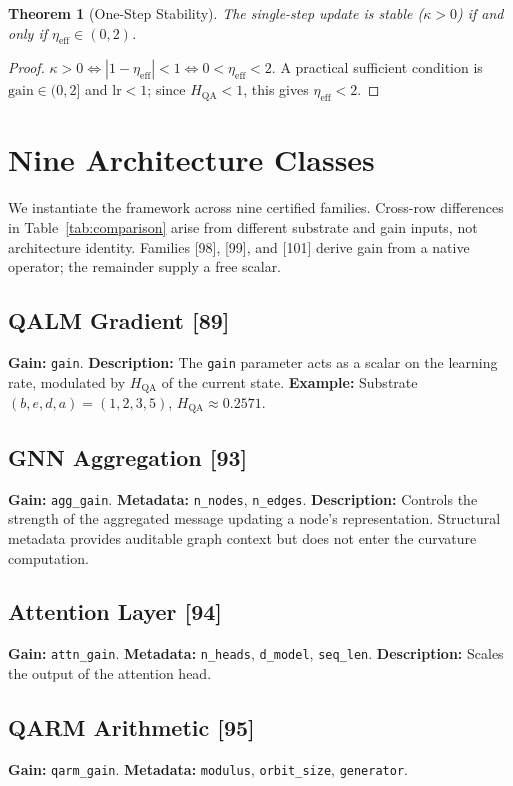 \documentclass[11pt]{article}
\newtheorem{theorem}{Theorem}[section]
\theoremstyle{definition}
\theoremstyle{remark}
\newcommand{\hqa}{H_{\mathrm{QA}}}
\newcommand{\etaeff}{\eta_{\mathrm{eff}}}
\begin{document}
\begin{theorem}[One-Step Stability]
The single-step update is stable ($\kappa>0$) if and only if $\etaeff\in(0,2)$.
\end{theorem}
\begin{proof}
$\kappa>0\Leftrightarrow |1-\etaeff|<1\Leftrightarrow 0<\etaeff<2$. A practical
sufficient condition is $\mathrm{gain}\in(0,2]$ and $\mathrm{lr}<1$; since
$\hqa<1$, this gives $\etaeff<2$.
\end{proof}

\section{Nine Architecture Classes}
\label{sec:families}

We instantiate the framework across nine certified families. Cross-row differences in
Table~\ref{tab:comparison} arise from different substrate and gain inputs, not
architecture identity. Families [98], [99], and [101] derive gain from a native
operator; the remainder supply a free scalar.

\subsection{QALM Gradient [89]}
\textbf{Gain:} \texttt{gain}. \textbf{Description:} The \texttt{gain} parameter
acts as a scalar on the learning rate, modulated by $\hqa$ of the current state.
\textbf{Example:} Substrate $(b,e,d,a)=(1,2,3,5)$, $\hqa\approx 0.2571$.

\subsection{GNN Aggregation [93]}
\textbf{Gain:} \texttt{agg\_gain}. \textbf{Metadata:} \texttt{n\_nodes},
\texttt{n\_edges}. \textbf{Description:} Controls the strength of the aggregated
message updating a node's representation. Structural metadata provides auditable
graph context but does not enter the curvature computation.

\subsection{Attention Layer [94]}
\textbf{Gain:} \texttt{attn\_gain}. \textbf{Metadata:} \texttt{n\_heads},
\texttt{d\_model}, \texttt{seq\_len}. \textbf{Description:} Scales the output of
the attention head.

\subsection{QARM Arithmetic [95]}
\textbf{Gain:} \texttt{qarm\_gain}. \textbf{Metadata:} \texttt{modulus},
\texttt{orbit\_size}, \texttt{generator}.
\end{document}
